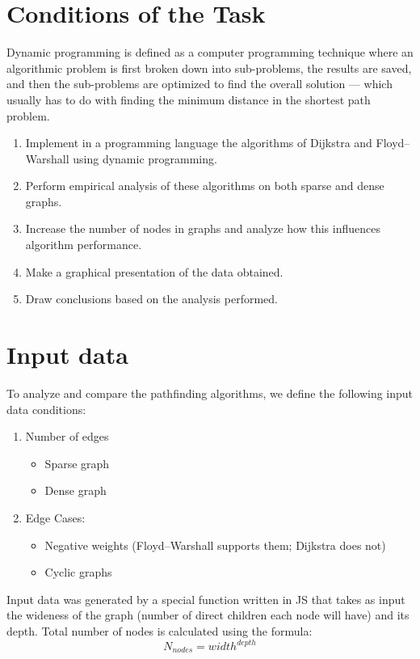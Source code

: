 \documentclass[12pt]{article}
\begin{document}
\section*{Conditions of the Task}
Dynamic programming is defined as a computer programming technique 
where an algorithmic problem is first broken down into sub-problems, 
the results are saved, and then the sub-problems are optimized 
to find the overall solution — which usually has to do with finding 
the minimum distance in the shortest path problem.
\begin{enumerate}
    \item Implement in a programming language the algorithms of Dijkstra and Floyd–Warshall using dynamic programming.
    \item Perform empirical analysis of these algorithms on both sparse and dense graphs.
    \item Increase the number of nodes in graphs and analyze how this influences algorithm performance.
    \item Make a graphical presentation of the data obtained.
    \item Draw conclusions based on the analysis performed.
\end{enumerate}

\clearpage
\section*{Input data}
\hspace{0.8cm}
To analyze and compare the pathfinding algorithms, we define the following input data conditions:
\begin{enumerate}
    \item Number of edges
      \begin{itemize}
        \item Sparse graph 
        \item Dense graph 
      \end{itemize}

    \item Edge Cases:
      \begin{itemize}
        \item Negative weights (Floyd–Warshall supports them; Dijkstra does not)
        \item Cyclic graphs
      \end{itemize}
\end{enumerate}

Input data was generated by a special function written in JS that takes as input 
the wideness of the graph (number of direct children each node will have) and its depth.
Total number of nodes is calculated using the formula: $$N_{nodes} = width^{depth}$$
\end{document}
